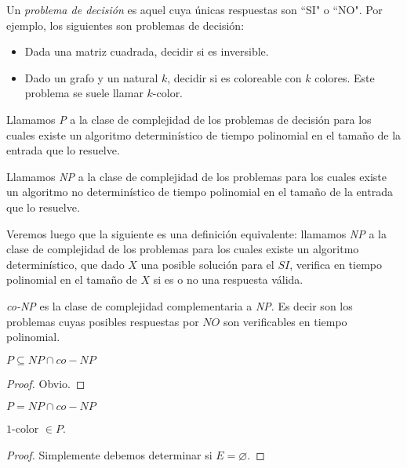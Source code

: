 \begin{definition}
Un \emph{problema de decisión} es aquel cuya únicas respuestas son ``SI" o ``NO".
Por ejemplo, los siguientes son problemas de decisión:
\begin{itemize}
    \item Dada una matriz cuadrada, decidir si es inversible.
    \item Dado un grafo y un natural $k$, decidir si es coloreable con $k$ colores. Este problema se suele llamar $k$-color.
\end{itemize}
\end{definition}

\begin{definition}
Llamamos \emph{P} a la clase de complejidad de los problemas de decisión para los cuales existe un algoritmo determinístico de tiempo polinomial en el tamaño de la entrada que lo resuelve.
\end{definition}

\begin{definition}
Llamamos \emph{NP} a la clase de complejidad de los problemas para los cuales existe un algoritmo no determinístico de tiempo polinomial en el tamaño de la entrada que lo resuelve.

Veremos luego que la siguiente es una definición equivalente: llamamos \emph{NP} a la clase de complejidad de los problemas para los cuales existe un algoritmo determinístico, que dado $X$ una posible solución para el $SI$, verifica en tiempo polinomial en el tamaño de $X$ si es o no una respuesta válida. 
\end{definition}

\begin{definition}
\emph{co-NP} es la clase de complejidad complementaria a \emph{NP}. Es decir son los problemas cuyas posibles respuestas por $NO$ son verificables en tiempo polinomial.
\end{definition}

\begin{proposition}
$P \subseteq NP \cap co-NP$
\end{proposition}
\begin{proof}
Obvio.
\end{proof}

\begin{conjecture}
$P = NP \cap co-NP$
\end{conjecture}

\begin{proposition}
$1$-color $\in P$.
\end{proposition}
\begin{proof}
Simplemente debemos determinar si $E = \varnothing$.
\end{proof}

